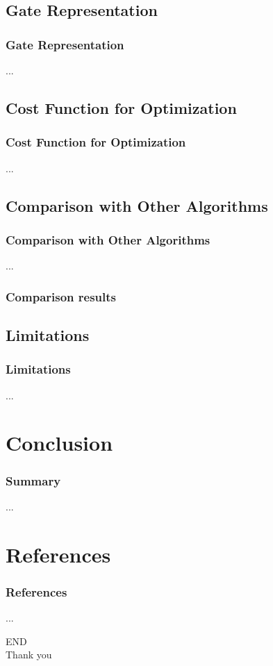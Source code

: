 \documentclass[aspectratio=1610]{beamer}
\begin{document}
\subsection{Gate Representation}
\begin{frame}
\frametitle{Gate Representation}
...
\end{frame}

\subsection{Cost Function for Optimization}
\begin{frame}
\frametitle{Cost Function for Optimization}
...
\end{frame}

\subsection{Comparison with Other Algorithms}
\begin{frame}
\frametitle{Comparison with Other Algorithms}
...
\end{frame}
\begin{frame}
\frametitle{Comparison results}
\end{frame}
\subsection{Limitations}
\begin{frame}
\frametitle{Limitations}
...
\end{frame}

\section{Conclusion}
\begin{frame}
\frametitle{Summary}
...
\end{frame}

\section{References}
\begin{frame}
\frametitle{References}
...
\end{frame}
\begin{frame}
  \centering
  \Huge{END\\Thank you}
\end{frame}
\end{document}

